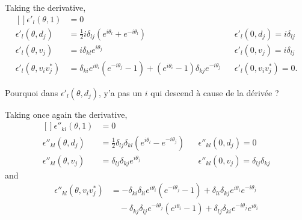 Taking the derivative,
\begin{equation}
	\begin{aligned}[]
		\epsilon'_l(\theta,1)        & =0                                                                                                                              \\
		\epsilon'_l(\theta,d_j)      & =\frac{ 1 }{2}i\delta_{lj}( e^{i\theta_l}+ e^{-i\theta_l})                                 &  & \epsilon'_l(0,d_j)=i\delta_{lj} \\
		\epsilon'_l(\theta,v_j)      & =i\delta_{kl} e^{i\theta_j}                                                                &  & \epsilon'_l(0,v_j)=i\delta_{lj} \\
		\epsilon'_l(\theta,v_iv_j^*) & =\delta_{ki} e^{i\theta_i}( e^{-i\theta_j}-1)+( e^{i\theta_i}-1)\delta_{kj} e^{-i\theta_j} &  & \epsilon'_l(0,v_iv_j^*)=0.
	\end{aligned}
\end{equation}

\begin{probleme}
	Pourquoi dans $\epsilon'_l(\theta,d_j)$, y'a pas un $i$ qui descend à cause de la dérivée ?
\end{probleme}

Taking once again the derivative,
\begin{equation}
	\begin{aligned}[]
		\epsilon''_{kl}(\theta,1)   & =0                                                                                                                      \\
		\epsilon''_{kl}(\theta,d_j) & =\frac{ 1 }{2}\delta_{lj}\delta_{kl}( e^{i\theta_l}- e^{-i\theta_j}) &  & \epsilon''_{kl}(0,d_j)=0                      \\
		\epsilon''_{kl}(\theta,v_j) & =\delta_{lj}\delta_{kj} e^{i\theta_j}                                &  & \epsilon''_{kl}(0,v_j)=\delta_{lj}\delta_{kj}
	\end{aligned}
\end{equation}
and
\begin{subequations}
	\begin{align}
		\epsilon''_{kl}(\theta,v_iv_j^*) &
		=-\delta_{ki}\delta_{li} e^{i\theta_i}( e^{-i\theta_j}-1)
		+\delta_{li}\delta_{kj} e^{i\theta_i} e^{-i\theta_j}                                              \\
		                                 & \quad-\delta_{kj}\delta_{lj} e^{-i\theta_j} ( e^{i\theta_i}-1)
		+\delta_{lj}\delta_{ki} e^{-i\theta_j} e^{i\theta_i}        \label{SubEqepsppsurvvs}
	\end{align}
\end{subequations}


